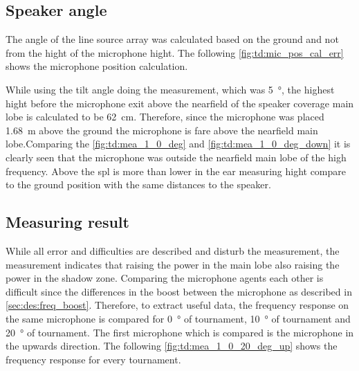 \subsection{Speaker angle}\label{sec:des:measuring_angle}
The angle of the line source array was calculated based on the ground and not from the hight of the microphone hight. The following \autoref{fig:td:mic_pos_cal_err} shows the microphone position calculation.



While using the tilt angle doing the measurement, which was \SI{5}{\degree}, the highest hight before the microphone exit above the nearfield of the speaker coverage main lobe is calculated to be \SI{62}{\centi\meter}. Therefore, since the microphone was placed \SI{1.68}{\meter} above the ground the microphone is fare above the nearfield main lobe.Comparing the \autoref{fig:td:mea_1_0_deg} and \autoref{fig:td:mea_1_0_deg_down} it is clearly seen that the microphone was outside the nearfield main lobe of the high frequency. Above  the \gls{spl} is more than  lower in the ear measuring hight compare to the ground position with the same distances to the speaker. 

\subsection{Measuring result}
While all error and difficulties are described and disturb the measurement, the measurement indicates that raising the power in the main lobe also raising the power in the shadow zone. Comparing the microphone agents each other is difficult since the differences in the boost between the microphone as described in \autoref{sec:des:freq_boost}. Therefore, to extract useful data, the frequency response on the same microphone is compared for \SI{0}{\degree} of tournament, \SI{10}{\degree} of tournament and \SI{20}{\degree} of tournament.   
The first microphone which is compared is the microphone in the upwards direction. The following \autoref{fig:td:mea_1_0_20_deg_up} shows the frequency response for every tournament.


